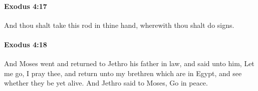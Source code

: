 		\paragraph{Exodus 4:17} %
			\label{EXODUS-4-17}

			And thou shalt take this rod in thine hand, wherewith thou shalt do signs.


		\paragraph{Exodus 4:18} %
			\label{EXODUS-4-18}

			And Moses went and returned to Jethro his father in law, and said unto him, Let me go, I pray thee, and return unto my brethren which are in Egypt, and see whether they be yet alive. And Jethro said to Moses, Go in peace.


